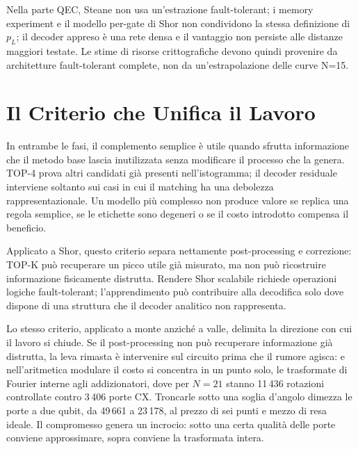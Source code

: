\begin{onehalfspace}
Nella parte QEC, Steane non usa un'estrazione fault-tolerant; i memory
experiment e il modello per-gate di Shor non condividono la stessa
definizione di $p_L$; il decoder appreso è una rete densa e il vantaggio
non persiste alle distanze maggiori testate. Le stime di risorse
crittografiche devono quindi provenire da architetture fault-tolerant
complete, non da un'estrapolazione delle curve N=15.

\section{Il Criterio che Unifica il Lavoro}

In entrambe le fasi, il complemento semplice è utile quando sfrutta
informazione che il metodo base lascia inutilizzata senza modificare il
processo che la genera. TOP-4 prova altri candidati già presenti
nell'istogramma; il decoder residuale interviene soltanto sui casi in cui
il matching ha una debolezza rappresentazionale. Un modello più
complesso non produce valore se replica una regola semplice, se le
etichette sono degeneri o se il costo introdotto compensa il beneficio.

Applicato a Shor, questo criterio separa nettamente post-processing e
correzione: TOP-K può recuperare un picco utile già misurato, ma non può
ricostruire informazione fisicamente distrutta. Rendere Shor scalabile
richiede operazioni logiche fault-tolerant; l'apprendimento può contribuire
alla decodifica solo dove dispone di una struttura che il decoder
analitico non rappresenta.

Lo stesso criterio, applicato a monte anziché a valle, delimita la direzione con cui il
lavoro si chiude. Se il post-processing non può recuperare informazione già distrutta, la
leva rimasta è intervenire sul circuito prima che il rumore agisca: e nell'aritmetica
modulare il costo si concentra in un punto solo, le trasformate di Fourier interne agli
addizionatori, dove per $N=21$ stanno 11\,436 rotazioni controllate contro 3\,406 porte
CX. Troncarle sotto una soglia d'angolo dimezza le porte a due qubit, da 49\,661 a
23\,178, al prezzo di sei punti e mezzo di resa ideale. Il compromesso genera un incrocio:
sotto una certa qualità delle porte conviene approssimare, sopra conviene la trasformata
intera.


\end{onehalfspace}
